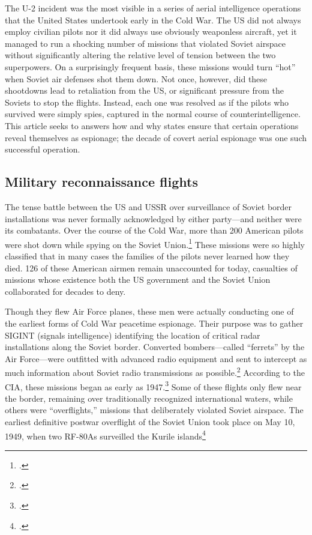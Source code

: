 \documentclass[14pt]{extarticle}
\begin{document}
The U-2 incident was the most visible in a series of aerial intelligence operations that the United States undertook early in the Cold War. The US did not always employ civilian pilots nor it did always use obviously weaponless aircraft, yet it managed to run a shocking number of missions that violated Soviet airspace without significantly altering the relative level of tension between the two superpowers. On a surprisingly frequent basis, these missions would turn \enquote{hot} when Soviet air defenses shot them down. Not once, however, did these shootdowns lead to retaliation from the US, or significant pressure from the Soviets to stop the flights. Instead, each one was resolved as if the pilots who survived were simply spies, captured in the normal course of counterintelligence. This article seeks to answers how and why states ensure that certain operations reveal themselves as espionage; the decade of covert aerial espionage was one such successful operation.

\subsection{Military reconnaissance flights}
The tense battle between the US and USSR over surveillance of Soviet border installations was never formally acknowledged by either party---and neither were its combatants. Over the course of the Cold War, more than 200 American pilots were shot down while spying on the Soviet Union.\footcite{glenshaw_secret_2017} These missions were so highly classified that in many cases the families of the pilots never learned how they died. 126 of these American airmen remain unaccounted for today, casualties of missions whose existence both the US government and the Soviet Union collaborated for decades to deny.

Though they flew Air Force planes, these men were actually conducting one of the earliest forms of Cold War peacetime espionage. Their purpose was to gather SIGINT (signals intelligence) identifying the location of critical radar installations along the Soviet border. Converted bombers---called \enquote{ferrets} by the Air Force---were outfitted with advanced radio equipment and sent to intercept as much information about Soviet radio transmissions as possible.\footcite[p.~4]{peterson_maybe_1993} According to the CIA, these missions began as early as 1947.\footcite[p.~4]{peterson_maybe_1993} Some of these flights only flew near the border, remaining over traditionally recognized international waters, while others were \enquote{overflights,} missions that deliberately violated Soviet airspace. The earliest definitive postwar overflight of the Soviet Union took place on May 10, 1949, when two RF-80As surveilled the Kurile islands\footcite[p.~8]{peebles_shadow_2000}
\end{document}
